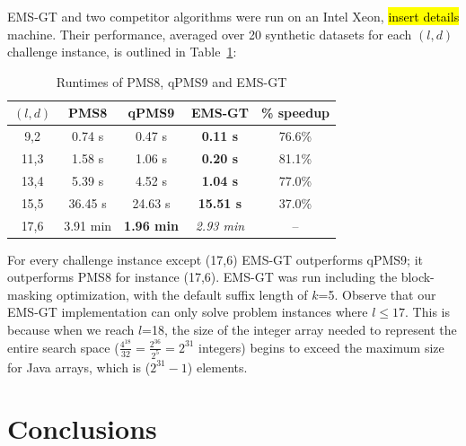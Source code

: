 \documentclass[oneside,12pt]{DISCSthesis}
\begin{document}
	EMS-GT and two competitor algorithms were run on an Intel Xeon, \hl{insert details} machine. Their performance, averaged over 20 synthetic datasets for each $(l,d)$ challenge instance, is outlined in Table~\ref{tbl:runtimes_v_pms}:

		\begin{table}[ht] %
			\renewcommand{\arraystretch}{1.3}
			\label{tbl:runtimes_v_pms}
			\centering
			\begin{tabular}{|c|c|c|c|c|}
			\hline \bfseries\boldmath $(l,d)$ & \bfseries PMS8 & \bfseries qPMS9 & \bfseries EMS-GT & \bfseries \% speedup\\
			\hline
			 9,2 &  0.74 s  &  0.47 s & {\bf 0.11 s} & 76.6\%\\
			11,3 &  1.58 s  &  1.06 s & {\bf 0.20 s} & 81.1\%\\
			13,4 &  5.39 s  &  4.52 s & {\bf 1.04 s} & 77.0\%\\
			15,5 & 36.45 s  & 24.63 s & {\bf15.51 s} & 37.0\%\\
			17,6 &  3.91 min & \textbf{1.96 min} & {\emph{2.93 min}} & --\\
			\hline\end{tabular}

			\caption{Runtimes of PMS8, qPMS9 and EMS-GT}
			\end{table}

		
		For every challenge instance except (17,6) EMS-GT outperforms qPMS9; it outperforms PMS8 for instance (17,6). EMS-GT was run including the block-masking optimization, with the default suffix length of $k$=5. Observe that our EMS-GT implementation can only solve problem instances where $l \leq 17$. This is because when we reach $l$=18, the size of the integer array needed to represent the entire search space ($\frac{4^{18}}{32} = \frac{2^{36}}{2^{5}} = 2^{31}$ integers) begins to exceed the maximum size for Java arrays, which is ($2^{31} - 1$) elements.\newline


\chapter{Conclusions}



%
\end{document}
